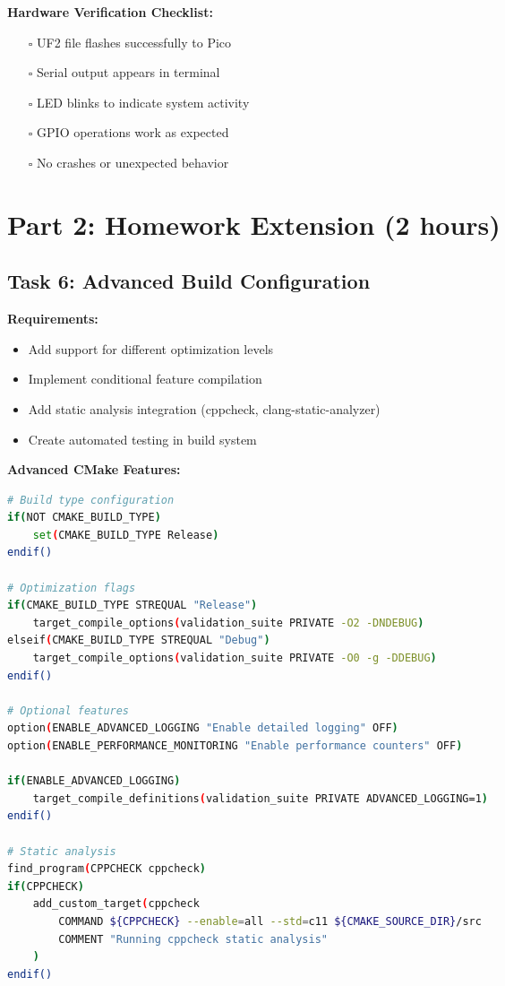 \documentclass[11pt,a4paper]{article}
\begin{document}
\textbf{Hardware Verification Checklist:}
\begin{itemize}
    \item[$\square$] UF2 file flashes successfully to Pico
    \item[$\square$] Serial output appears in terminal
    \item[$\square$] LED blinks to indicate system activity
    \item[$\square$] GPIO operations work as expected
    \item[$\square$] No crashes or unexpected behavior
\end{itemize}

\section{Part 2: Homework Extension (2 hours)}

\subsection{Task 6: Advanced Build Configuration}

\textbf{Requirements:}
\begin{itemize}
    \item Add support for different optimization levels
    \item Implement conditional feature compilation
    \item Add static analysis integration (cppcheck, clang-static-analyzer)
    \item Create automated testing in build system
\end{itemize}

\textbf{Advanced CMake Features:}
\begin{lstlisting}[language=bash]
# Build type configuration
if(NOT CMAKE_BUILD_TYPE)
    set(CMAKE_BUILD_TYPE Release)
endif()

# Optimization flags
if(CMAKE_BUILD_TYPE STREQUAL "Release")
    target_compile_options(validation_suite PRIVATE -O2 -DNDEBUG)
elseif(CMAKE_BUILD_TYPE STREQUAL "Debug")
    target_compile_options(validation_suite PRIVATE -O0 -g -DDEBUG)
endif()

# Optional features
option(ENABLE_ADVANCED_LOGGING "Enable detailed logging" OFF)
option(ENABLE_PERFORMANCE_MONITORING "Enable performance counters" OFF)

if(ENABLE_ADVANCED_LOGGING)
    target_compile_definitions(validation_suite PRIVATE ADVANCED_LOGGING=1)
endif()

# Static analysis
find_program(CPPCHECK cppcheck)
if(CPPCHECK)
    add_custom_target(cppcheck
        COMMAND ${CPPCHECK} --enable=all --std=c11 ${CMAKE_SOURCE_DIR}/src
        COMMENT "Running cppcheck static analysis"
    )
endif()
\end{lstlisting}
\end{document}
